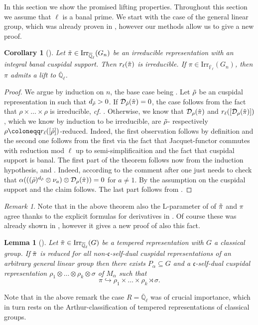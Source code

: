 \documentclass[10pt,a4paper]{article}
\newtheorem{corollary}{Corollary}[section]
\newtheorem{lemma}{Lemma}
\theoremstyle{remark}
\newtheorem{rem}{Remark}[section]
\theoremstyle{definition}
\newcommand{\fl}{{\overline{\mathbb{F}}_\ell}}
\newcommand{\ql}{{\overline{\mathbb{Q}}_\ell}}
\newcommand{\tpi}{\Tilde{\pi}}
\newcommand{\trho}{{\Tilde{\rho}}}
\newcommand{\irr}{\mathrm{Irr}}
\newcommand{\rl}{r_\ell}
\newcommand{\dr}{\mathcal{D}_\rho}
\newcommand{\Z}{\mathrm{L}}
\newcommand{\hra}{\hookrightarrow}
\newcommand{\fc}{\mathfrak{c}}
\begin{document}
In this section we show the promised lifting properties. Throughout this section we assume that $\ell$ is a banal prime.
We start with the case of the general linear group, which was already proven in \cite{minguez2013representations}, however our methods allow us to give a new proof.    
\begin{corollary}[{\cite[Theorem 6.1]{minguez2013representations}}]\label{T:lift}
    Let $\tpi\in\irr_\ql(G_n)$ be an irreducible representation with an integral banal cuspidal support. Then $\rl(\tpi)$ is irreducible. 
    If $\pi\in\irr_\fl(G_n)$, then $\pi$ admits a lift to $\ql$.
\end{corollary}
\begin{proof}
    We argue by induction on $n$, the base case being . Let $\trho$ be an cuspidal representation in such that $d_\trho>0$. If $\mathcal{D}_\trho(\tpi)=0$, the case follows from the fact that $\rho\times\ldots\times\rho$ is irreducible, \emph{cf.} \cite{minguez2013representations}. Otherwise, we know that $\mathcal{D}_\rho(\tpi)$ and $\rl([\dr(\tpi)])$, which we know by induction to be irreducible, are $\trho$- respectively $\rho\coloneqq \rl([\trho])$-reduced. Indeed, the first observation follows by definition and the second one follows from the first via the fact that Jacquet-functor commutes with reduction mod $\ell$ up to semi-simplificaition and the fact that cuspidal support is banal. The first part of the theorem follows now from the induction hypothesis,  and . 
    Indeed, according to the comment after 
    one just needs to check that $\alpha(((\trho)^{d_\trho}\otimes\nu_a)\otimes \mathcal{D}_\rho(\tpi))=0$ for $a\neq 1$. By the assumption on the cuspidal support and  the claim follows.
    The last part follows from .
\end{proof}
\begin{rem}
    Note that in the above theorem also the $\Z$-parameter of \cite{MinSec14} of $\tpi$ and $\pi$ agree thanks to the explicit formulas for derivatives in \cite{Dro24}.
    Of course these was already shown in \cite{minguez2013representations}, however it gives a new proof of also this fact.
\end{rem}
\begin{lemma}[{\cite[5.3]{AtobeMinguez2020}}]\label{L:basecasetempered}
    Let $\tpi\in\irr_\ql(G)$ be a tempered representation with $G$ a classical group. If $\tpi$ is reduced for all non-$\fc$-self-dual cuspidal representations of an arbitrary general linear group then there exists $P_\alpha\subseteq G$ and a $\fc$-self-dual cuspidal representation $\rho_1\otimes\ldots\otimes\rho_k\otimes\sigma$ of $M_\alpha$ such that  \[\pi\hra \rho_1\times\ldots\times\rho_k\rtimes \sigma.\]
\end{lemma}
Note that in the above remark the case $R=\ql$ was of crucial importance, which in turn rests on the Arthur-classification of tempered representations of classical groups. 
\end{document}

